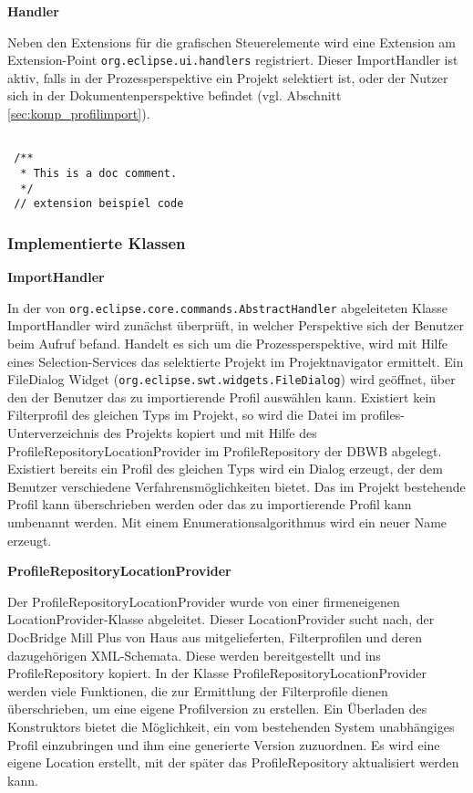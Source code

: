 {{{{{}
\textbf{Handler}{

Neben den Extensions für die grafischen Steuerelemente wird eine Extension am Extension-Point \texttt{org.eclipse.ui.handlers} registriert. Dieser ImportHandler ist aktiv, falls in der Prozessperspektive ein Projekt selektiert ist, oder der Nutzer sich in der Dokumentenperspektive befindet (vgl. Abschnitt \ref{sec:komp_profilimport}). 
}

 \begin{lstlisting}[caption={Toolbar Extension},label=lst:extension]
 
 /**
  * This is a doc comment.
  */
 // extension beispiel code
 \end{lstlisting}


}

\subsubsection{Implementierte Klassen}{
\label{sec:impl_klassen}
\textbf{ImportHandler}{

In der von \texttt{org.eclipse.core.commands.AbstractHandler} abgeleiteten Klasse ImportHandler wird zunächst überprüft, in welcher Perspektive sich der Benutzer beim Aufruf befand. Handelt es sich um die Prozessperspektive, wird mit Hilfe eines Selection-Services das selektierte Projekt im Projektnavigator ermittelt. Ein FileDialog Widget (\texttt{org.eclipse.swt.widgets.FileDialog}) wird geöffnet, über den der Benutzer das zu importierende Profil auswählen kann. Existiert kein Filterprofil des gleichen Typs im Projekt, so wird die Datei im profiles-Unterverzeichnis des Projekts kopiert und mit Hilfe des ProfileRepositoryLocationProvider im ProfileRepository der \ac {DBWB} abgelegt. Existiert bereits ein Profil des gleichen Typs wird ein Dialog erzeugt, der dem Benutzer verschiedene Verfahrensmöglichkeiten bietet. Das im Projekt bestehende Profil kann überschrieben werden oder das zu importierende Profil kann umbenannt werden. Mit einem Enumerationsalgorithmus wird ein neuer Name erzeugt.

}

\textbf{ProfileRepositoryLocationProvider}{

Der ProfileRepositoryLocationProvider wurde von einer firmeneigenen LocationProvider-Klasse abgeleitet. Dieser LocationProvider sucht nach, der DocBridge Mill Plus von Haus aus mitgelieferten, Filterprofilen und deren dazugehörigen XML-Schemata. Diese werden bereitgestellt und ins ProfileRepository kopiert. In der Klasse ProfileRepositoryLocationProvider werden viele Funktionen, die zur Ermittlung der Filterprofile dienen überschrieben, um eine eigene Profilversion zu erstellen. Ein Überladen des Konstruktors bietet die Möglichkeit, ein vom bestehenden System unabhängiges Profil einzubringen und ihm eine generierte Version zuzuordnen. Es wird eine eigene Location erstellt, mit der später das ProfileRepository aktualisiert werden kann.

}}}}}

